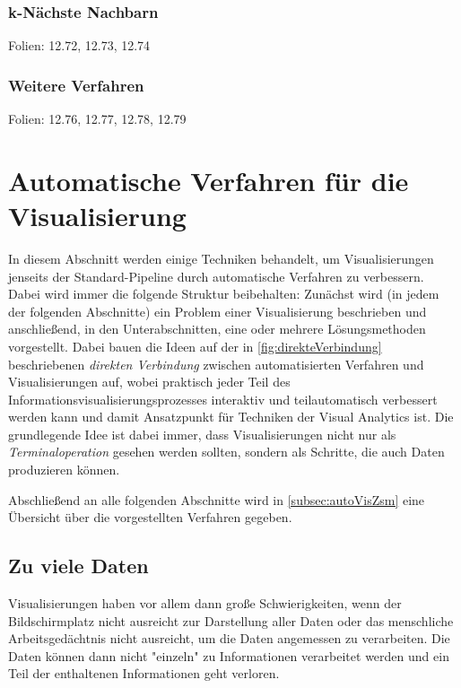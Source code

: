 			\subsubsection{k-Nächste Nachbarn}
				  Folien: 12.72, 12.73, 12.74

			\subsubsection{Weitere Verfahren}
				  Folien: 12.76, 12.77, 12.78, 12.79

	\section{Automatische Verfahren für die Visualisierung}
		In diesem Abschnitt werden einige Techniken behandelt, um Visualisierungen jenseits der Standard-Pipeline durch automatische Verfahren zu verbessern. Dabei wird immer die folgende Struktur beibehalten: Zunächst wird (in jedem der folgenden Abschnitte) ein Problem einer Visualisierung beschrieben und anschließend, in den Unterabschnitten, eine oder mehrere Lösungsmethoden vorgestellt. Dabei bauen die Ideen auf der in \autoref{fig:direkteVerbindung} beschriebenen \emph{direkten Verbindung} zwischen automatisierten Verfahren und Visualisierungen auf, wobei praktisch jeder Teil des Informationsvisualisierungsprozesses interaktiv und teilautomatisch verbessert werden kann und damit Ansatzpunkt für Techniken der Visual Analytics ist. Die grundlegende Idee ist dabei immer, dass Visualisierungen nicht nur als \emph{Terminaloperation} gesehen werden sollten, sondern als Schritte, die auch Daten produzieren können.

		Abschließend an alle folgenden Abschnitte wird in \autoref{subsec:autoVisZsm} eine Übersicht über die vorgestellten Verfahren gegeben.

		\subsection{Zu viele Daten}
			Visualisierungen haben vor allem dann große Schwierigkeiten, wenn der Bildschirmplatz nicht ausreicht zur Darstellung aller Daten oder das menschliche Arbeitsgedächtnis nicht ausreicht, um die Daten angemessen zu verarbeiten. Die Daten können dann nicht "einzeln" zu Informationen verarbeitet werden und ein Teil der enthaltenen Informationen geht verloren.

